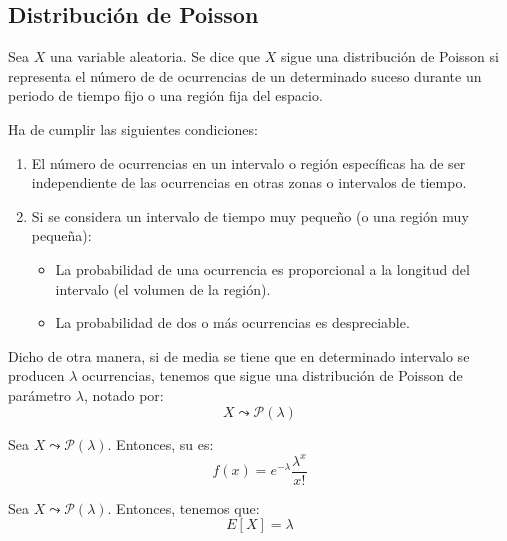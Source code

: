 \subsection{Distribución de Poisson}
\begin{definicion}
    Sea $X$ una variable aleatoria. Se dice que $X$ sigue una distribución de Poisson si representa el número de de ocurrencias de un determinado suceso durante un periodo de tiempo fijo o una región fija del espacio.

    Ha de cumplir las siguientes condiciones:
    \begin{enumerate}
        \item El número de ocurrencias en un intervalo o región específicas ha de ser independiente de las ocurrencias en otras zonas o intervalos de tiempo.

        \item Si se considera un intervalo de tiempo muy pequeño (o una región muy pequeña):
        \begin{itemize}
            \item La probabilidad de una ocurrencia es proporcional a la longitud del intervalo (el volumen de la región).
            \item La probabilidad de dos o más ocurrencias es despreciable.
        \end{itemize}
    \end{enumerate}

    Dicho de otra manera, si de media se tiene que en determinado intervalo se producen $\lambda$ ocurrencias, tenemos que sigue una distribución de Poisson de parámetro $\lambda$, notado por:
    \begin{equation*}
        X\leadsto \mathcal{P}(\lambda)
    \end{equation*}
\end{definicion}

\begin{prop} Sea $X\leadsto \mathcal{P}(\lambda)$. Entonces, su  es:
    \begin{equation*}
        f(x)=e^{-\lambda}\frac{\lambda^x}{x!}
    \end{equation*}
\end{prop}

\begin{prop}
    Sea $X\leadsto \mathcal{P}(\lambda)$. Entonces, tenemos que:
    \begin{equation*}
        E[X]= \lambda
    \end{equation*}
\end{prop}

